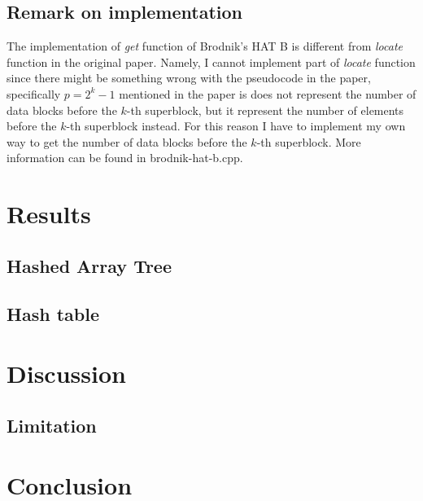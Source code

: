 \documentclass{article} %
\begin{document}
    \subsection*{Remark on implementation}
    The implementation of \emph{get} function of Brodnik's HAT B is different from \emph{locate} function in the original paper.
    Namely, I cannot implement part of \emph{locate} function since there might be something wrong with the pseudocode in the paper,
    specifically \emph{$p=2^k - 1$} mentioned in the paper is does not represent the number of data blocks before the $k$-th superblock,
    but it represent the number of elements before the $k$-th superblock instead. For this reason I have to implement my own way to get the number of
    data blocks before the $k$-th superblock. More information can be found in brodnik-hat-b.cpp.

    \section*{Results}
    \subsection*{Hashed Array Tree}
    \subsection*{Hash table}

    \section*{Discussion}
    \subsection*{Limitation}

    \section*{Conclusion}
\end{document}
